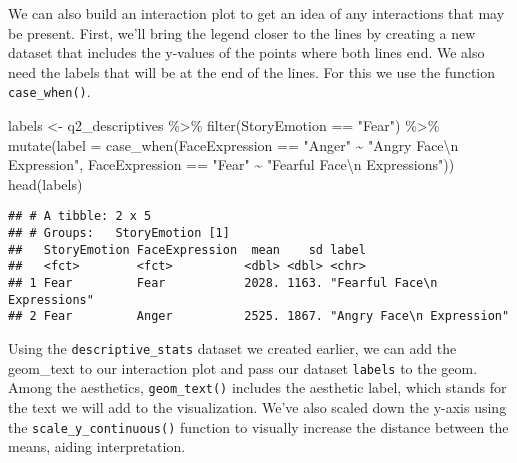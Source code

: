 \documentclass[
]{article}
\newenvironment{Shaded}{\begin{snugshade}}{\end{snugshade}}
\newcommand{\AttributeTok}[1]{\textcolor[rgb]{0.77,0.63,0.00}{#1}}
\newcommand{\FunctionTok}[1]{\textcolor[rgb]{0.00,0.00,0.00}{#1}}
\newcommand{\NormalTok}[1]{#1}
\newcommand{\OtherTok}[1]{\textcolor[rgb]{0.56,0.35,0.01}{#1}}
\newcommand{\SpecialCharTok}[1]{\textcolor[rgb]{0.00,0.00,0.00}{#1}}
\newcommand{\StringTok}[1]{\textcolor[rgb]{0.31,0.60,0.02}{#1}}
\begin{document}
We can also build an interaction plot to get an idea of any interactions
that may be present. First, we'll bring the legend closer to the lines
by creating a new dataset that includes the y-values of the points where
both lines end. We also need the labels that will be at the end of the
lines. For this we use the function \texttt{case\_when()}.

\begin{Shaded}
\begin{Highlighting}[]
\NormalTok{labels }\OtherTok{\textless{}{-}}\NormalTok{ q2\_descriptives }\SpecialCharTok{\%\textgreater{}\%} 
  \FunctionTok{filter}\NormalTok{(StoryEmotion }\SpecialCharTok{==} \StringTok{"Fear"}\NormalTok{) }\SpecialCharTok{\%\textgreater{}\%} 
  \FunctionTok{mutate}\NormalTok{(}\AttributeTok{label =} \FunctionTok{case\_when}\NormalTok{(FaceExpression }\SpecialCharTok{==} \StringTok{"Anger"} \SpecialCharTok{\textasciitilde{}} \StringTok{"Angry Face}\SpecialCharTok{\textbackslash{}n}\StringTok{ Expression"}\NormalTok{,}
\NormalTok{                           FaceExpression }\SpecialCharTok{==} \StringTok{"Fear"} \SpecialCharTok{\textasciitilde{}} \StringTok{"Fearful Face}\SpecialCharTok{\textbackslash{}n}\StringTok{ Expressions"}\NormalTok{))}
\FunctionTok{head}\NormalTok{(labels)}
\end{Highlighting}
\end{Shaded}

\begin{verbatim}
## # A tibble: 2 x 5
## # Groups:   StoryEmotion [1]
##   StoryEmotion FaceExpression  mean    sd label                       
##   <fct>        <fct>          <dbl> <dbl> <chr>                       
## 1 Fear         Fear           2028. 1163. "Fearful Face\n Expressions"
## 2 Fear         Anger          2525. 1867. "Angry Face\n Expression"
\end{verbatim}

Using the \texttt{descriptive\_stats} dataset we created earlier, we can
add the geom\_text to our interaction plot and pass our dataset
\texttt{labels} to the geom. Among the aesthetics, \texttt{geom\_text()}
includes the aesthetic label, which stands for the text we will add to
the visualization. We've also scaled down the y-axis using the
\texttt{scale\_y\_continuous()} function to visually increase the
distance between the means, aiding interpretation.
\end{document}

